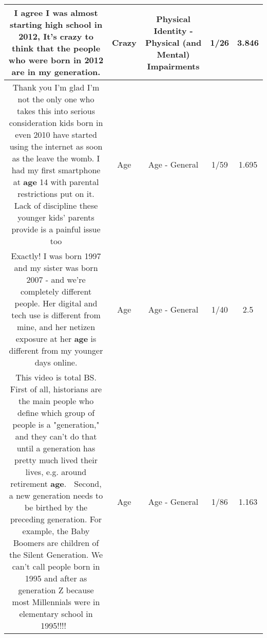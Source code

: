 \documentclass[11pt]{article}
\newlength\mylength
\begin{document}
\begin{center}
\begin{longtable}{|C{.65\mylength}|C{.30\mylength}|C{.12\mylength}|C{.12\mylength}|C{.12\mylength}|}
  \small I agree I was almost starting high school in 2012, It's \textbf{crazy} to think that the people who were born in 2012 are in my generation.\normalsize   & Crazy & Physical Identity - Physical (and Mental) Impairments & 1/26 & 3.846 \\  \hline
  \small Thank you I'm glad I'm not the only one who takes this into serious consideration kids born in even 2010 have started using the internet as soon as the leave the womb. I had my first smartphone at \textbf{age} 14 with parental restrictions put on it. Lack of discipline these younger kids' parents provide is a painful issue too\normalsize   & Age & Age - General & 1/59 & 1.695 \\  \hline
  \small Exactly! I was born 1997 and my sister was born 2007 - and we're completely different people. Her digital and tech use is different from mine, and her netizen exposure at her \textbf{age} is different from my younger days online.\normalsize   & Age & Age - General & 1/40 & 2.5 \\  \hline
  \small This video is total BS. First of all, historians are the main people who define which group of people is a "generation," and they can't do that until a generation has pretty much lived their lives, e.g. around retirement \textbf{age}. 🤦 Second, a new generation needs to be birthed by the preceding generation. For example, the Baby Boomers are children of the Silent Generation. We can't call people born in 1995 and after as generation Z because most Millennials were in elementary school in 1995!!!! 👀\normalsize   & Age & Age - General & 1/86 & 1.163 \\  \hline

\end{longtable}
\end{center}
\end{document}
